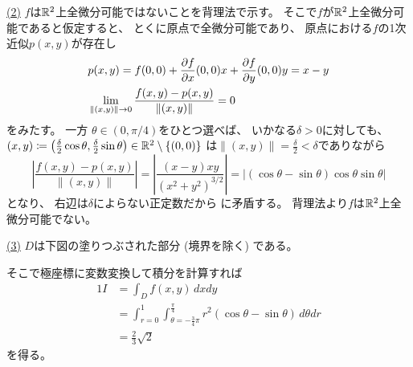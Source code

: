 \documentclass[report]{jlreq}
\begin{document}
\begin{answer}
    \uline{(2)} \quad
    $f$は$\mathbb{R}^2$上全微分可能ではないことを背理法で示す。
    そこで$f$が$\mathbb{R}^2$上全微分可能であると仮定すると、
    とくに原点で全微分可能であり、
    原点における$f$の1次近似$p(x, y)$が存在し
    \begin{alignat}{1}
        &p(x, y)
            = f(0, 0) + \deldel[f]{x}(0, 0) x + \deldel[f]{y}(0, 0) y
            = x - y \\
        &\lim_{\| (x, y) \| \to 0}
            \frac{f(x, y) - p(x, y)}{\| (x, y) \|}
            = 0
            \locallabel{eq:limit}
    \end{alignat}
    をみたす。
    一方
    $\theta \in (0, \pi / 4)$をひとつ選べば、
    いかなる$\delta > 0$に対しても、
    $(x, y)
        \coloneqq \left({
            \frac{\delta}{2} \cos \theta,
            \frac{\delta}{2} \sin \theta
        }\right)
        \in \mathbb{R}^2 \setminus \{(0, 0)\}$
    は$\| (x, y) \| = \frac{\delta}{2} < \delta$でありながら
    \begin{equation}
        \left| \frac{f(x, y) - p(x, y)}{\| (x, y) \|} \right|
            = \left| \frac{(x - y) xy}{(x^2 + y^2)^{3/2}} \right|
            = \left|
                (\cos \theta - \sin \theta)
                \cos \theta \sin \theta
            \right|
    \end{equation}
    となり、
    右辺は$\delta$によらない正定数だから
    に矛盾する。
    背理法より$f$は$\mathbb{R}^2$上全微分可能でない。

    \uline{(3)} \quad
    $D$は下図の塗りつぶされた部分 (境界を除く) である。
    \begin{center}
    \end{center}
    そこで極座標に変数変換して積分を計算すれば
    \begin{alignat}{1}
        I
            &= \int_D f(x, y) \, dx dy \\
            &= \int_{r = 0}^1 \int_{\theta = -\frac{3}{4}\pi}^{\frac{\pi}{4}}
                r^2 (\cos \theta - \sin \theta) \, d\theta dr \\
            &= \frac{2}{3} \sqrt{2}
    \end{alignat}
    を得る。
\end{answer}
\end{document}
